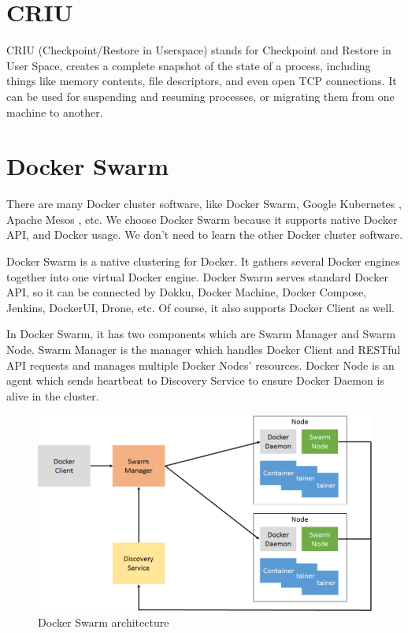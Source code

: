 \section{CRIU}
CRIU \cite{CRIU} (Checkpoint/Restore in Userspace) stands for Checkpoint and Restore in User Space, creates a complete snapshot of the state of a process, including things like memory contents, file descriptors, and even open TCP connections. It can be used for suspending and resuming processes, or migrating them from one machine to another.

\section{Docker Swarm}
There are many Docker cluster software, like Docker Swarm\cite{DockerSwarm}, Google Kubernetes \cite{bernstein2014containers}, Apache Mesos \cite{hindman2011mesos}, etc. We choose Docker Swarm because it supports native Docker API, and Docker usage. We don't need to learn the other Docker cluster software.

Docker Swarm is a native clustering for Docker. It gathers several Docker engines together into one virtual Docker engine. Docker Swarm serves standard Docker API, so it can be connected by Dokku, Docker Machine, Docker Compose, Jenkins, DockerUI, Drone, etc. Of course, it also supports Docker Client as well.

In Docker Swarm, it has two components which are Swarm Manager and Swarm Node. Swarm Manager is the manager which handles Docker Client and RESTful API requests and manages multiple Docker Nodes' resources. Docker Node is an agent which sends heartbeat to Discovery Service to ensure Docker Daemon is alive in the cluster.

\begin{figure}[h]
\begin{center}
\includegraphics[width=15cm]{figure/swarm_docker.png}
\end{center}
\caption{Docker Swarm architecture}
\end{figure}

